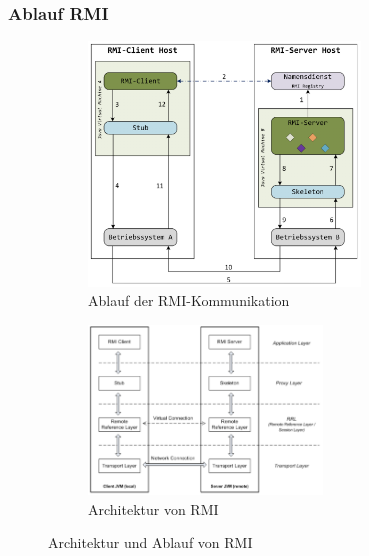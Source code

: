 \documentclass[a4paper]{article}
\begin{document}
					\newpage
			
			\subsubsection{Ablauf RMI}
			
			\begin{figure}[!htb]
				\centering
					\begin{subfigure}{.45\textwidth}
						\centering
						\includegraphics[keepaspectratio, height=6.5cm]{img/rmi/rmi_ablauf.png}
						\caption{Ablauf der RMI-Kommunikation}
						\label{fig:rmi_ablauf}
					\end{subfigure}
					\begin{subfigure}{.45\textwidth}
						\centering
						\includegraphics[keepaspectratio, height=4.5cm]{img/rmi/rmi_architecture.png}
						\caption{Architektur von RMI}
						\label{fig:rmi_architecture}
					\end{subfigure}			
				\caption{Architektur und Ablauf von RMI}
				\label{fig:rmi_architecture_ablauf}
			\end{figure}	
		
\end{document}
